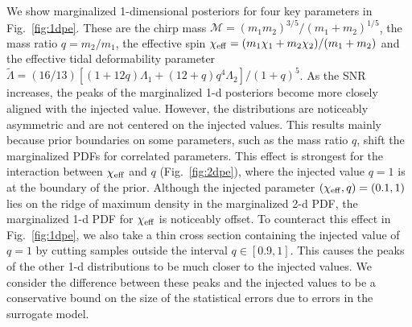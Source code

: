 \documentclass[prd,aps,letter,twocolumn,floatfix,notitlepage,nofootinbib]{revtex4-1}
\begin{document}
We show marginalized 1-dimensional posteriors for four key parameters in Fig.~\ref{fig:1dpe}. These are the chirp mass $\mathcal{M} = (m_1 m_2)^{3/5}/(m_1+m_2)^{1/5}$, the mass ratio $q=m_2/m_1$, the effective spin $\chi_{\rm eff} = (m_1\chi_1+m_2\chi_2)/(m_1+m_2)$ and the effective tidal deformability parameter $\tilde\Lambda = (16/13) [(1+12q)\Lambda_1 + (12+q)q^4\Lambda_2]/(1+q)^5$. As the SNR increases, the peaks of the marginalized 1-d posteriors become more closely aligned with the injected value. However, the distributions are noticeably asymmetric and are not centered on the injected values. 
This results mainly because prior boundaries on some parameters, such as the mass ratio $q$, shift the marginalized PDFs for correlated parameters.
This effect is strongest for the interaction between $\chi_{\rm eff}$ and $q$ (Fig.~\ref{fig:2dpe}), where the injected value $q=1$ is at the boundary of the prior. Although the injected parameter $(\chi_{\rm eff}, q) = (0.1, 1)$ lies on the ridge of maximum density in the marginalized 2-d PDF, the marginalized 1-d PDF for $\chi_{\rm eff}$ is noticeably offset. To counteract this effect in Fig.~\ref{fig:1dpe}, we also take a thin cross section containing the injected value of $q=1$ by cutting samples outside the interval $q \in [0.9, 1]$. This causes the peaks of the other 1-d distributions to be much closer to the injected values. We consider the difference between these peaks and the injected values to be a conservative bound on the size of the statistical errors due to errors in the surrogate model.
\end{document}
